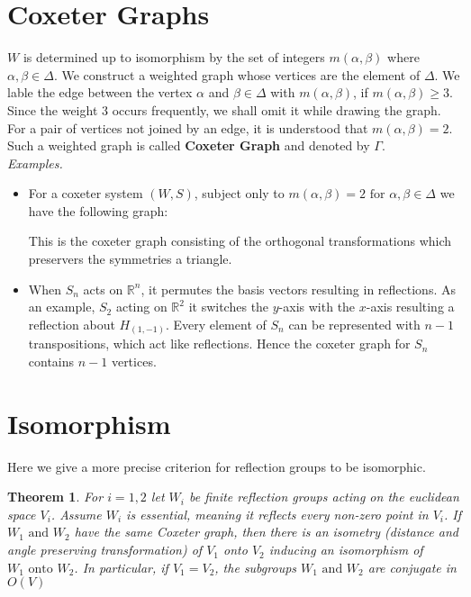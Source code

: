 \documentclass[11pt]{article}
\theoremstyle{plain}
\newtheorem{theorem}{Theorem}[section]
\begin{document}
\section{Coxeter Graphs}
$ W $ is determined up to isomorphism by the set of integers $ m \left( \alpha , \beta \right)  $ where
$ \alpha, \beta \in \Delta$. We construct a weighted graph whose vertices are the element of $ \Delta $. We lable the edge between the vertex $ \alpha  $ and $ \beta \in \Delta $ with $ m \left(\alpha, \beta \right)$, if $ m \left( \alpha ,\beta  \right) \geq 3 $.  Since the weight 3 occurs frequently, we shall omit it while drawing the graph. For a pair of vertices not joined by an edge, it is understood that $ m \left( \alpha ,\beta  \right) = 2$. Such a weighted graph is called \textbf{Coxeter Graph} and denoted by $ \Gamma $.
\vspace{0.6em} \\
\emph{Examples.}
\begin{itemize}
	\item For a coxeter system $ \left( W, S \right)$, subject only to $ m \left( \alpha ,\beta  \right) = 2 \text{ for } \alpha , \beta \in \Delta $ we have the following graph:
		\begin{figure}[H]
			\centering
			
		\end{figure}
		This is the coxeter graph consisting of the orthogonal transformations which preservers the symmetries a triangle. 
	\item When $ S_{n} $ acts on $ \mathbb{R}^n $, it permutes the basis vectors resulting in reflections. As an example, 
		$ S_2 $ acting on $ \mathbb{R}^{2} $ it switches the $ y$-axis with the $ x$-axis resulting a reflection about 
		$ H_{\left( 1, -1 \right) } $. Every element of $ S_n $ can be represented with $ n-1 $ transpositions, which 
		act like reflections. Hence the coxeter graph for $ S_n $ contains $ n-1 $ vertices.
		\begin{figure}[h]
			\centering
			
		\end{figure}
\end{itemize}
\section{Isomorphism}
Here we give a more precise criterion for reflection groups to be isomorphic. 

\begin{theorem}
	For $ i = 1,2 $ let $ W_i $ be finite reflection groups acting on the euclidean space $ V_i $. Assume $ W_i $ is 
	essential, meaning it reflects every non-zero point in $ V_i $. If $ W_1 \text{ and  } W_2 $ have the same 
	Coxeter graph, then there is an isometry (distance and angle preserving transformation) of $ V_1 $ onto $ V_2 $ 
	inducing an isomorphism of $ W_1 \text{ onto } W_2 $. In particular, if $ V_1 = V_2 $, the subgroups $ W_1 \text{ and }
	W_2 $ are conjugate in $ O (V)  $ 
\end{theorem}
\end{document}
